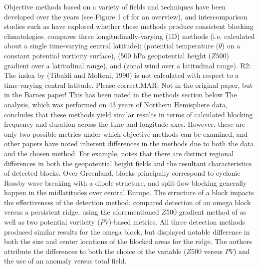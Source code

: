 \documentclass[smallextended]{svjour3}       %
\numberwithin{equation}{section}
\begin{document}
Objective methods based on a variety of fields and techniques have been developed over the years (see Figure 1 of \cite{barriopedro_application_2010} for an overview), and intercomparison studies such as \cite{barnes_methodology_2012} have explored whether these methods produce consistent blocking climatologies. \cite{barnes_methodology_2012} compares three longitudinally-varying (1D) methods (i.e. calculated about a single time-varying central latitude): \citealt{pelly_new_2003} (potential temperature ($\theta$) on a constant potential vorticity surface), \citealt{tibaldi_operational_1990} (500 hPa geopotential height ($Z500$) gradient over a latitudinal range), and \citealt{scaife_atmospheric_2010} (zonal wind over a latitudinal range).
{\color{teal}R2: The index by (Tibaldi and Molteni, 1990) is not calculated with respect to a time-varying central latitude. Please correct.}{\color{blue}MAR: Not in the original paper, but in the Barnes paper! This has been noted in the methods section below}
The analysis, which was performed on 43 years of Northern Hemisphere data, concludes that these methods yield similar results in terms of calculated blocking frequency and duration across the time and longitude axes. However, these are only two possible metrics under which objective methods can be examined, and other papers have noted inherent differences in the methods due to both the data and the chosen method. For example, \cite{davini_bidimensional_2012} notes that there are distinct regional differences in both the geopotential height fields and the resultant characteristics of detected blocks. Over Greenland, blocks principally correspond to cyclonic Rossby wave breaking with a dipole structure, and split-flow blocking generally happen in the midlatitudes over central Europe. The structure of a block impacts the effectiveness of the detection method; \cite{scherrer_two-dimensional_2006} compared detection of an omega block versus a persistent ridge, using the aforementioned $Z500$ gradient method of \cite{tibaldi_operational_1990} as well as two potential vorticity ($PV$)-based metrics. All three detection methods produced similar results for the omega block, but displayed notable difference in both the size and center locations of the blocked areas for the ridge. The authors attribute the differences to both the choice of the variable ($Z500$ versus $PV$) and the use of an anomaly versus total field. 
\end{document}
